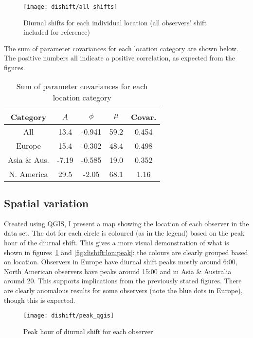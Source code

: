 \begin{figure}[h!]
	\centering
	\texttt{[image: dishift/all\_shifts]}
	\caption{Diurnal shifts for each individual location (all observers' shift included for reference)
		\label{fig:dishift:all}}
\end{figure}

The sum of parameter covariances for each location category are shown below. The positive numbers all indicate a positive correlation, as expected from the figures. 
\begin{table}[h!]
	\begin{tabular}{ccccc}
		\hline
		Category & $A$ & $\phi$ & $\mu$ & Covar. \\ \hline
		All & 13.4 & -0.941 & 59.2 & 0.454 \\
		Europe & 15.4 & -0.302 & 48.4 & 0.498 \\
		Asia \& Aus. & -7.19 & -0.585 & 19.0 & 0.352 \\
		N. America & 29.5 & -2.05 & 68.1 & 1.16 \\
		\hline
	\end{tabular}
	\caption{Sum of parameter covariances for each location category}
\end{table}

\subsection{Spatial variation}
Created using QGIS, I present a map showing the location of each observer in the data set. The dot for each circle is coloured (as in the legend) based on the peak hour of the diurnal shift. This gives a more visual demonstration of what is shown in figures~\ref{fig:dishift:all} and \ref{fig:dishift:lon:peak}: the colours are clearly grouped based on location. Observers in Europe have diurnal shift peaks mostly around 6:00, North American observers have peaks around 15:00 and in Asia \& Australia around 20. This supports implications from the previously stated figures. There are clearly anomalous results for some observers (note the blue dots in Europe), though this is expected.
\begin{figure}[h!]
	\centering
	\texttt{[image: dishift/peak\_qgis]}
	\caption{Peak hour of diurnal shift for each observer
		\label{fig:dishift:qgis}}
\end{figure}
